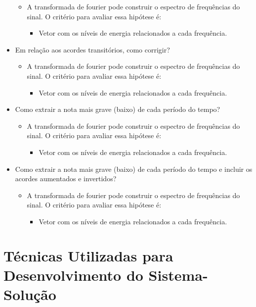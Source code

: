 \begin{itemize}
\begin{itemize}
		\item A transformada de fourier pode construir o espectro de frequências do sinal.
		O critério para avaliar essa hipótese é:
			\begin{itemize}
				\item Vetor com os níveis de energia relacionados a cada frequência.		
			\end{itemize}
	\end{itemize}
	\item Em relação aos acordes transitórios, como corrigir?
	\begin{itemize}
		\item A transformada de fourier pode construir o espectro de frequências do sinal.
		O critério para avaliar essa hipótese é:
			\begin{itemize}
				\item Vetor com os níveis de energia relacionados a cada frequência.		
			\end{itemize}
	\end{itemize}
	\item Como extrair a nota mais grave (baixo) de cada período do tempo?
	\begin{itemize}
		\item A transformada de fourier pode construir o espectro de frequências do sinal.
		O critério para avaliar essa hipótese é:
			\begin{itemize}
				\item Vetor com os níveis de energia relacionados a cada frequência.		
			\end{itemize}
	\end{itemize}
	\item Como extrair a nota mais grave (baixo) de cada período do tempo e incluir os acordes aumentados e invertidos?
	\begin{itemize}
		\item A transformada de fourier pode construir o espectro de frequências do sinal.
		O critério para avaliar essa hipótese é:
			\begin{itemize}
				\item Vetor com os níveis de energia relacionados a cada frequência.		
			\end{itemize}
	\end{itemize}
\end{itemize}


\section{Técnicas Utilizadas para Desenvolvimento do Sistema-Solução}

